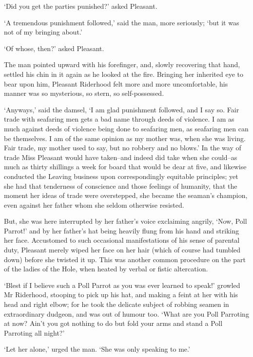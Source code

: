 ‘Did you get the parties punished?’ asked Pleasant.

‘A tremendous punishment followed,’ said the man, more seriously; ‘but
it was not of my bringing about.’

‘Of whose, then?’ asked Pleasant.

The man pointed upward with his forefinger, and, slowly recovering that
hand, settled his chin in it again as he looked at the fire. Bringing
her inherited eye to bear upon him, Pleasant Riderhood felt more
and more uncomfortable, his manner was so mysterious, so stern, so
self-possessed.

‘Anyways,’ said the damsel, ‘I am glad punishment followed, and I say
so. Fair trade with seafaring men gets a bad name through deeds of
violence. I am as much against deeds of violence being done to seafaring
men, as seafaring men can be themselves. I am of the same opinion as my
mother was, when she was living. Fair trade, my mother used to say, but
no robbery and no blows.’ In the way of trade Miss Pleasant would have
taken--and indeed did take when she could--as much as thirty shillings
a week for board that would be dear at five, and likewise conducted the
Leaving business upon correspondingly equitable principles; yet she had
that tenderness of conscience and those feelings of humanity, that the
moment her ideas of trade were overstepped, she became the seaman’s
champion, even against her father whom she seldom otherwise resisted.

But, she was here interrupted by her father’s voice exclaiming angrily,
‘Now, Poll Parrot!’ and by her father’s hat being heavily flung from his
hand and striking her face. Accustomed to such occasional manifestations
of his sense of parental duty, Pleasant merely wiped her face on her
hair (which of course had tumbled down) before she twisted it up. This
was another common procedure on the part of the ladies of the Hole, when
heated by verbal or fistic altercation.

‘Blest if I believe such a Poll Parrot as you was ever learned to
speak!’ growled Mr Riderhood, stooping to pick up his hat, and making
a feint at her with his head and right elbow; for he took the delicate
subject of robbing seamen in extraordinary dudgeon, and was out of
humour too. ‘What are you Poll Parroting at now? Ain’t you got nothing
to do but fold your arms and stand a Poll Parroting all night?’

‘Let her alone,’ urged the man. ‘She was only speaking to me.’

